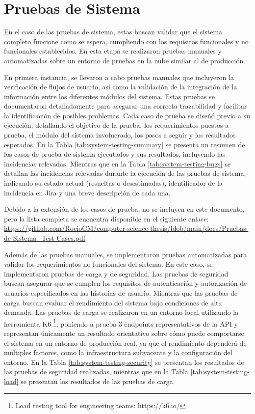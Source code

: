 \section{Pruebas de Sistema}

En el caso de las pruebas de sistema, estas buscan validar que el sistema completo funcione como se espera, cumpliendo con los requisitos funcionales y no funcionales establecidos. En esta etapa se realizaron pruebas manuales y automatizadas sobre un entorno de pruebas en la nube similar al de producción.

En primera instancia, se llevaron a cabo pruebas manuales que incluyeron la verificación de flujos de usuario, así como la validación de la integración de la información entre los diferentes módulos del sistema. Estas pruebas se documentaron detalladamente para asegurar una correcta trazabilidad y facilitar la identificación de posibles problemas. Cada caso de prueba se diseñó previo a su ejecución, detallando el objetivo de la prueba, los requerimientos puestos a prueba, el módulo del sistema involucrado, los pasos a seguir y los resultados esperados. En la Tabla \ref{tab:system-testing-summary} se presenta un resumen de los casos de prueba de sistema ejecutados y sus resultados, incluyendo las incidencias relevadas. Mientras que en la Tabla \ref{tab:system-testing-bugs} se detallan las incidencias relevadas durante la ejecución de las pruebas de sistema, indicando su estado actual (resueltas o desestimadas), identificador de la incidencia en Jira y una breve descripción de cada una.

Debido a la extensión de los casos de prueba, no se incluyen en este documento, pero la lista completa se encuentra disponible en el siguiente enlace: \href{https://github.com/RocioCM/computer-science-thesis/blob/main/docs/Pruebas-de-Sistema_Test-Cases.pdf}{https://github.com/RocioCM/computer-science-thesis/blob/main/docs/Pruebas-de-Sistema_Test-Cases.pdf}

Además de las pruebas manuales, se implementaron pruebas automatizadas para validar los requerimientos no funcionales del sistema. En este caso, se implementaron pruebas de carga y de seguridad. Las pruebas de seguridad buscan asegurar que se cumplen los requisitos de autenticación y autorización de usuarios especificados en las historias de usuario. Mientras que las pruebas de carga buscan evaluar el rendimiento del sistema bajo condiciones de alta demanda. Las pruebas de carga se realizaron en un entorno local utilizando la herramienta K6 \footnote{Load testing tool for engineering teams: https://k6.io/}, poniendo a prueba 3 endpoints representativos de la API y representan únicamente un resultado orientativo sobre cómo puede comportarse el sistema en un entorno de producción real, ya que el rendimiento dependerá de múltiples factores, como la infraestructura subyacente y la configuración del entorno. En la Tabla \ref{tab:system-testing-security} se presentan los resultados de las pruebas de seguridad realizadas, mientras que en la Tabla \ref{tab:system-testing-load} se presentan los resultados de las pruebas de carga.

